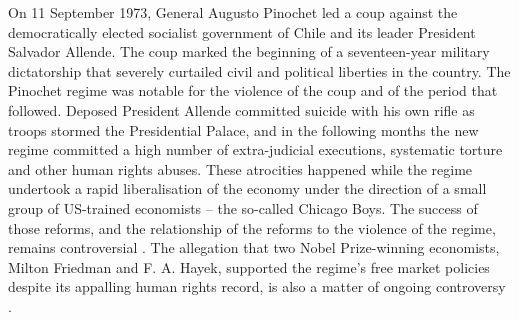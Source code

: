 \documentclass[a4paper,12pt]{article}
\begin{document}
On 11 September 1973, General Augusto Pinochet led a coup against the democratically elected socialist government of Chile and its leader President Salvador Allende. The coup marked the beginning of a seventeen-year military dictatorship that severely curtailed civil and political liberties in the country. The Pinochet regime was notable for the violence of the coup and of the period that followed. Deposed President Allende committed suicide with his own rifle as troops stormed the Presidential Palace, and in the following months the new regime committed a high number of extra-judicial executions, systematic torture and other human rights abuses. These atrocities happened while the regime undertook a rapid liberalisation of the economy under the direction of a small group of US-trained economists -- the so-called Chicago Boys. The success of those reforms, and the relationship of the reforms to the violence of the regime, remains controversial \citep{silva1991technocrats,valdes1995pinochet}. The allegation that two Nobel Prize-winning economists, Milton Friedman and F. A. Hayek, supported the regime's free market policies despite its appalling human rights record, is also a matter of ongoing controversy \citep{farrant2014can,farrant2012preventing,meadowcroft2014hayek}.
\end{document}

